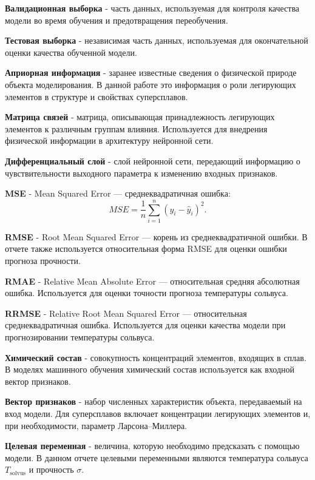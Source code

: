 \textbf{Валидационная выборка} - часть данных, используемая для 
контроля качества модели во время обучения и предотвращения 
переобучения.

\textbf{Тестовая выборка} - независимая часть данных, используемая 
для окончательной оценки качества обученной модели.

\textbf{Априорная информация} - заранее известные сведения о 
физической природе объекта моделирования. В данной работе это 
информация о роли легирующих элементов в структуре и свойствах 
суперсплавов.

\textbf{Матрица связей} - матрица, описывающая принадлежность 
легирующих элементов к различным группам влияния. Используется 
для внедрения физической информации в архитектуру нейронной сети.

\textbf{Дифференциальный слой} - слой нейронной сети, передающий 
информацию о чувствительности выходного параметра к изменению 
входных признаков.

\textbf{MSE} - Mean Squared Error --- среднеквадратичная ошибка:
$$MSE = \frac{1}{n}\sum_{i=1}^{n}\left(y_i-\hat{y}_i\right)^2.$$

\textbf{RMSE} - Root Mean Squared Error --- корень из среднеквадратичной 
ошибки. В отчете также используется относительная форма RMSE для 
оценки ошибки прогноза прочности.

\textbf{RMAE} - Relative Mean Absolute Error --- относительная средняя
абсолютная ошибка. Используется для оценки точности прогноза 
температуры сольвуса.

\textbf{RRMSE} - Relative Root Mean Squared Error --- относительная 
среднеквадратичная ошибка. Используется для оценки качества модели 
при прогнозировании температуры сольвуса.

\textbf{Химический состав} - совокупность концентраций элементов, 
входящих в сплав. В моделях машинного обучения химический состав 
используется как входной вектор признаков.

\textbf{Вектор признаков} - набор численных характеристик объекта, 
передаваемый на вход модели. Для суперсплавов включает концентрации 
легирующих элементов и, при необходимости, параметр Ларсона--Миллера.

\textbf{Целевая переменная} - величина, которую необходимо 
предсказать с помощью модели. В данном отчете целевыми переменными 
являются температура сольвуса $T_{\mathrm{solvus}}$ и прочность $\sigma$.